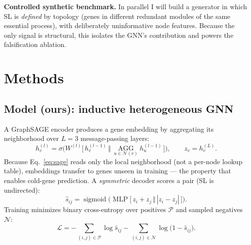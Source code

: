 \documentclass[11pt]{article}
\begin{document}
\noindent\textbf{Controlled synthetic benchmark.} In parallel I will build a
generator in which SL is \emph{defined} by topology (genes in different
redundant modules of the same essential process), with deliberately
uninformative node features. Because the only signal is structural, this
isolates the GNN's contribution and powers the falsification ablation.

\section{Methods}

\subsection{Model (ours): inductive heterogeneous GNN}
A GraphSAGE encoder produces a gene embedding by aggregating its neighborhood
over $L{=}3$ message-passing layers:
\begin{equation}
h_v^{(l)} = \sigma\!\Big( W^{(l)} \big[\, h_v^{(l-1)} \,\big\Vert\,
\textstyle\operatorname*{AGG}_{u\in\mathcal{N}(v)} h_u^{(l-1)} \,\big] \Big),
\qquad z_v = h_v^{(L)} .
\label{eq:sage}
\end{equation}
Because Eq.~\eqref{eq:sage} reads only the local neighborhood (not a per-node
lookup table), embeddings transfer to genes unseen in training --- the property
that enables cold-gene prediction. A \emph{symmetric} decoder scores a pair
(SL is undirected):
\begin{equation}
\hat{s}_{ij} = \operatorname{sigmoid}\!\Big(\operatorname{MLP}\big[\,
z_i + z_j \,\big\Vert\, |z_i - z_j| \,\big]\Big).
\label{eq:decoder}
\end{equation}
Training minimizes binary cross-entropy over positives $\mathcal{P}$ and
sampled negatives $\mathcal{N}$:
\begin{equation}
\mathcal{L} = -\!\!\sum_{(i,j)\in\mathcal{P}}\!\!\log \hat{s}_{ij}
              -\!\!\sum_{(i,j)\in\mathcal{N}}\!\!\log\big(1-\hat{s}_{ij}\big).
\label{eq:bce}
\end{equation}
\end{document}
